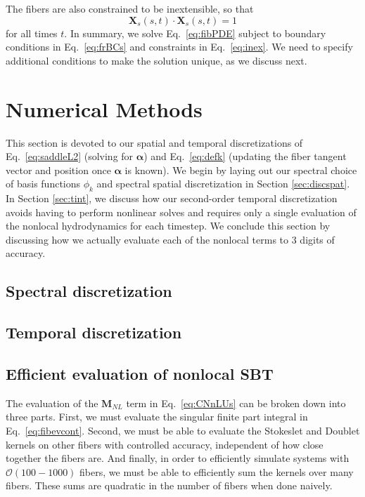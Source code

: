 \documentclass[12pt]{article}
\newcommand{\V}[1]{\boldsymbol{#1}}                 %
\newcommand{\M}[1]{\boldsymbol{#1}}
\begin{document}
The fibers are also constrained to be inextensible, so that 
\begin{equation}
\label{eq:inex}
\V{X}_s(s,t) \cdot \V{X}_s(s,t)=1 
\end{equation}
for all times $t$. In summary, we solve Eq.\ \eqref{eq:fibPDE} subject to boundary conditions in Eq.\ \eqref{eq:frBCs} and constraints in Eq.\ \eqref{eq:inex}. We need to specify additional conditions to make the solution unique, as we discuss next. 



\section{Numerical Methods}
This section is devoted to our spatial and temporal discretizations of Eq.\ \eqref{eq:saddleL2} (solving for $\V{\alpha}$) and Eq.\ \eqref{eq:defk} (updating the fiber tangent vector and position once $\V{\alpha}$ is known). We begin by laying out our spectral choice of basis functions $\phi_k$ and spectral spatial discretization in Section \ref{sec:discspat}. In Section \ref{sec:tint}, we discuss how our second-order temporal discretization avoids having to perform nonlinear solves and requires only a single evaluation of the nonlocal hydrodynamics for each timestep. We conclude this section by discussing how we actually evaluate each of the nonlocal terms to 3 digits of accuracy. 

\subsection{Spectral discretization \label{sec:discspat}}


\subsection{Temporal discretization \label{sec:tint}}


\subsection{Efficient evaluation of nonlocal SBT}
The evaluation of the $\M{M}_{NL}$ term in Eq.\ \eqref{eq:CNnLUs} can be broken down into three parts. First, we must evaluate the singular finite part integral in Eq.\ \eqref{eq:fibevcont}. Second, we must be able to evaluate the Stokeslet and Doublet kernels on other fibers with controlled accuracy, independent of how close together the fibers are. And finally, in order to efficiently simulate systems with $\mathcal{O}(100-1000)$ fibers, we must be able to efficiently sum the kernels over many fibers. These sums are quadratic in the number of fibers when done naively. 
\end{document}
